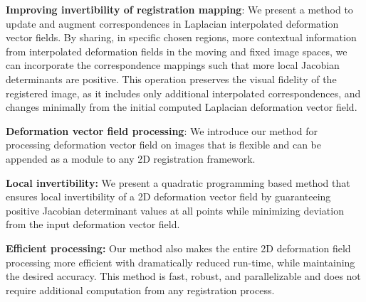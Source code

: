 \textbf{Improving invertibility of registration mapping}: We present a method to update and augment correspondences in Laplacian interpolated deformation vector fields. By sharing, in specific chosen regions, more contextual information from interpolated deformation fields in the moving and fixed image spaces, we can incorporate the correspondence mappings such that more local Jacobian determinants are positive. This operation preserves the visual fidelity of the registered image, as it includes only additional interpolated correspondences, and changes minimally from the initial computed Laplacian deformation vector field.

\textbf{Deformation vector field processing}: We introduce our method for processing deformation vector field on images that is flexible and can be appended as a module to any 2D registration framework.

\textbf{Local invertibility:} We present a quadratic programming based method that ensures local invertibility of a 2D deformation vector field by guaranteeing positive Jacobian determinant values at all points while minimizing deviation from the input deformation vector field.

\textbf{Efficient processing:} Our method also makes the entire 2D deformation field processing more efficient with dramatically reduced run-time, while maintaining the desired accuracy. This method is fast, robust, and parallelizable and does not require additional computation from any registration process.  

